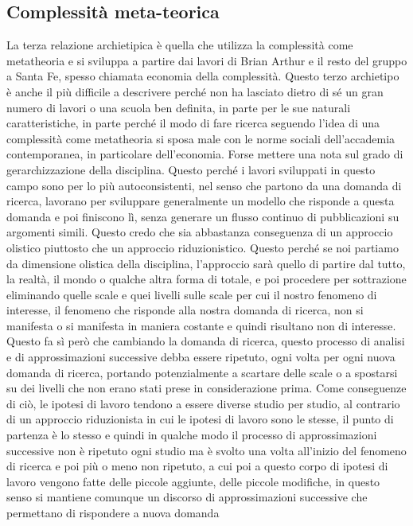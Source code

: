 \documentclass[a4paper, headings=standardclasses]{scrartcl}
\begin{document}
\subsection{Complessità meta-teorica}
La terza relazione archietipica è quella che utilizza la complessità come metatheoria
e si sviluppa a partire dai lavori di Brian Arthur e il resto del gruppo a Santa Fe, spesso chiamata economia della complessità.
Questo terzo archietipo è anche il più difficile a descrivere perché non ha lasciato dietro
di sé un gran numero di lavori o una scuola ben definita, in parte per le sue naturali
caratteristiche, in parte perché il modo di fare ricerca seguendo l'idea di una complessità
come metatheoria si sposa male con le norme sociali dell'accademia contemporanea,
in particolare dell'economia. Forse mettere una nota sul grado di gerarchizzazione della disciplina.
Questo perché i lavori sviluppati in questo campo sono per lo più autoconsistenti,
nel senso che partono da una domanda di ricerca, lavorano per sviluppare generalmente un modello
che risponde a questa domanda e poi finiscono lì, senza generare un flusso continuo di pubblicazioni
su argomenti simili. Questo credo che sia abbastanza conseguenza di un approccio olistico
piuttosto che un approccio riduzionistico. Questo perché se noi partiamo da dimensione
olistica della disciplina, l'approccio sarà quello di partire dal tutto, la realtà,
il mondo o qualche altra forma di totale, e poi procedere per sottrazione eliminando
quelle scale e quei livelli sulle scale per cui il nostro fenomeno di interesse,
il fenomeno che risponde alla nostra domanda di ricerca, non si manifesta o si manifesta
in maniera costante e quindi risultano non di interesse. Questo fa sì però che cambiando
la domanda di ricerca, questo processo di analisi e di approssimazioni successive debba
essere ripetuto, ogni volta per ogni nuova domanda di ricerca, portando potenzialmente
a scartare delle scale o a spostarsi su dei livelli che non erano stati prese in considerazione
prima. Come conseguenze di ciò, le ipotesi di lavoro tendono a essere diverse studio
per studio, al contrario di un approccio riduzionista in cui le ipotesi di lavoro sono
le stesse, il punto di partenza è lo stesso e quindi in qualche modo il processo di approssimazioni
successive non è ripetuto ogni studio ma è svolto una volta all'inizio del fenomeno
di ricerca e poi più o meno non ripetuto, a cui poi a questo corpo di ipotesi di lavoro
vengono fatte delle piccole aggiunte, delle piccole modifiche, in questo senso si mantiene
comunque un discorso di approssimazioni successive che permettano di rispondere a nuova domanda
\end{document}
